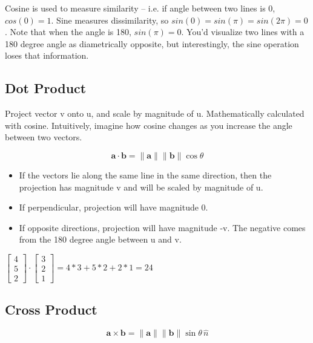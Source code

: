 \documentclass{article}
\begin{document}
Cosine is used to measure similarity -- i.e. if angle between two lines is 0, $cos(0) = 1$. Sine measures dissimilarity, so $sin(0) = sin(\pi) = sin(2\pi) = 0$. Note that when the angle is 180, $sin(\pi) = 0$. You'd visualize two lines with a 180 degree angle as diametrically opposite, but interestingly, the sine operation loses that information.

\subsection{Dot Product}
Project vector v onto u, and scale by magnitude of u. Mathematically calculated with cosine. Intuitively, imagine how cosine changes as you increase the angle between two vectors.

$$ \mathbf{a} \cdot \mathbf{b} = \|\mathbf{a}\| \|\mathbf{b}\| \cos\theta $$

\begin{itemize}
    \item If the vectors lie along the same line in the same direction, then the projection has magnitude v and will be scaled by magnitude of u. 
    \item If perpendicular, projection will have magnitude 0. 
    \item If opposite directions, projection will have magnitude -v. The negative comes from the 180 degree angle between u and v. 
\end{itemize}

$\begin{bmatrix}
    4 \\ 5 \\ 2
\end{bmatrix}
\cdot
\begin{bmatrix}
    3 \\ 2 \\ 1
\end{bmatrix}
= 4 * 3 + 5 * 2 + 2 * 1 = 24
$

\subsection{Cross Product}
$$ \mathbf{a} \times \mathbf{b} = \|\mathbf{a}\| \|\mathbf{b}\| \sin\theta \, \hat{n} $$
\end{document}
